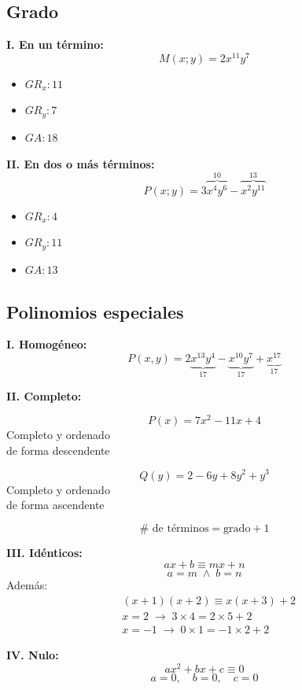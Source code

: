 \documentclass[11pt,a4paper]{article}
\begin{document}
\subsection*{Grado}

\begin{minipage}[t]{0.485\textwidth}
\textbf{I. En un término:}
\[M(x;y) = 2x^{11}y^{7}\]
\begin{itemize}[label={}]
  \item $GR_x: 11$
  \item $GR_y: 7$
  \item $GA: 18$
\end{itemize}
\end{minipage}\hfill
\begin{minipage}[t]{0.485\textwidth}
\textbf{II. En dos o más términos:}
\[P(x;y) = 3\overbrace{x^{4}y^{6}}^{10} - \overbrace{x^{2}y^{11}}^{13}\]
\begin{itemize}[label={}]
  \item $GR_x: 4$
  \item $GR_y: 11$
  \item $GA: 13$
\end{itemize}
\end{minipage}

\subsection*{Polinomios especiales}

\textbf{I. Homogéneo:}
\[P(x,y) = 2\underbrace{x^{13}y^{4}}_{17} - \underbrace{x^{10}y^{7}}_{17} + \underbrace{x^{17}}_{17}\]

\textbf{II. Completo:}

\begin{minipage}[t]{0.485\textwidth}
\[P(x) = 7x^2 - 11x + 4\]
\centering Completo y ordenado\\ de forma descendente
\end{minipage}\hfill
\begin{minipage}[t]{0.485\textwidth}
\[Q(y) = 2 - 6y + 8y^2 + y^3\]
\centering Completo y ordenado\\ de forma ascendente
\end{minipage}

\[\#\text{ de términos} = \text{grado} + 1\]

\begin{minipage}[t]{0.485\textwidth}
\textbf{III. Idénticos:}
\[ax + b \equiv mx + n\]
\[a = m \;\wedge\; b = n\]
\textcolor{rojo}{Además:}
\begin{align*}
&(x+1)(x+2) \equiv x(x+3) + 2\\
&x = 2 \;\rightarrow\; 3\times 4 = 2\times 5 + 2\\
&x = -1 \;\rightarrow\; 0\times 1 = -1\times 2 + 2
\end{align*}
\end{minipage}\hfill
\begin{minipage}[t]{0.485\textwidth}
\textbf{IV. Nulo:}
\[ax^2 + bx + c \equiv 0\]
\[a = 0,\quad b = 0,\quad c = 0\]
\end{minipage}
\end{document}
